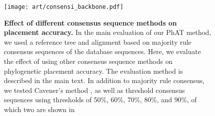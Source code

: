 
\begin{figure}[hpbt]
    \centering
    \texttt{[image: art/consensi\_backbone.pdf]}
    \begin{subfigure}{0pt}
        \label{fig:consensi_backbone:sub:majorities}
    \end{subfigure}
    \begin{subfigure}{0pt}
        \label{fig:consensi_backbone:sub:cavener}
    \end{subfigure}
    \begin{subfigure}{0pt}
        \label{fig:consensi_backbone:sub:50_threshold}
    \end{subfigure}
    \begin{subfigure}{0pt}
        \label{fig:consensi_backbone:sub:90_threshold}
    \end{subfigure}
    \caption[Effect of different consensus sequence methods on placement accuracy]{
        \textbf{Effect of different consensus sequence methods on placement accuracy.}
        In the main evaluation of our \ac{PhAT} method,
        we used a reference tree and alignment based on majority rule consensus sequences \citep{May1952,Day1992a}
        of the  database sequences.
        Here, we evaluate the effect of using other consensus sequence methods
        on phylogenetic placement accuracy.
        The evaluation method is described in the main text.
        In addition to  majority rule consensus, we tested
         Cavener's method \citep{Cavener1987,Cavener1991a},
        as well as threshold consensus sequences \citep{Day1992a,Day1992}
        using thresholds of 50\%, 60\%, 70\%, 80\%, and 90\%, of which two are shown in
}
\end{figure}
